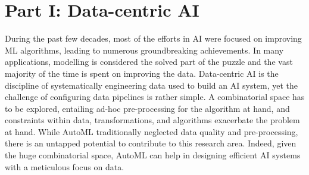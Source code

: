 \section*{Part I: Data-centric AI}

During the past few decades, most of the efforts in AI were focused on improving ML algorithms, leading to numerous groundbreaking achievements.
In many applications, modelling is considered the solved part of the puzzle and the vast majority of the time is spent on improving the data.
Data-centric AI is the discipline of systematically engineering data used to build an AI system, yet the challenge of configuring data pipelines is rather simple.
A combinatorial space has to be explored, entailing ad-hoc pre-processing for the algorithm at hand, and constraints within data, transformations, and algorithms exacerbate the problem at hand.
While AutoML traditionally neglected data quality and pre-processing, there is an untapped potential to contribute to this research area.
Indeed, given the huge combinatorial space, AutoML can help in designing efficient AI systems with a meticulous focus on data.



